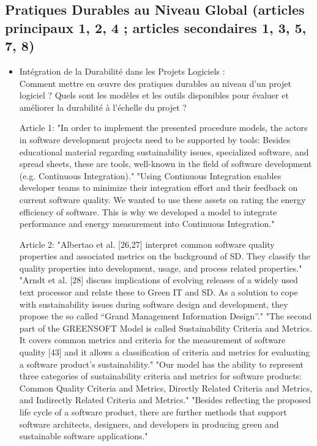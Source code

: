 \subsection{Pratiques Durables au Niveau Global (articles principaux 1, 2, 4 ; articles secondaires 1, 3, 5, 7, 8)}
    \begin{itemize}
    \item Intégration de la Durabilité dans les Projets Logiciels : \\
    Comment mettre en œuvre des pratiques durables au niveau d'un projet logiciel ? Quels sont les modèles et les outils disponibles pour évaluer et améliorer la durabilité à l'échelle du projet ?

Article 1:
"In order to implement the presented procedure models, the actors in software development projects need to be supported by tools: Besides educational material regarding sustainability issues, specialized software, and spread sheets, these are tools, well-known in the field of software development (e.g. Continuous Integration)." 
"Using Continuous Integration enables developer teams to minimize their integration effort and their feedback on current software quality. We wanted to use these assets on rating the energy efficiency of software. This is why we developed a model to integrate performance and energy measurement into Continuous Integration."

Article 2:
"Albertao et al. [26,27] interpret common software quality properties and associated metrics on the background of SD. They classify the quality properties into development, usage, and process related properties."
"Arndt et al. [28] discuss implications of evolving releases of a widely used text processor and relate these to Green IT and SD. As a solution to cope with sustainability issues during software design and development, they propose the so called “Grand Management Information Design”."
"The second part of the GREENSOFT Model is called Sustainability Criteria and Metrics. It covers common metrics and criteria for the measurement of software quality [43] and it allows a classification of criteria and metrics for evaluating a software product’s sustainability."
"Our model has the ability to represent three categories of sustainability criteria and metrics for software products: Common Quality Criteria and Metrics, Directly Related Criteria and Metrics, and Indirectly Related Criteria and Metrics."
"Besides reflecting the proposed life cycle of a software product, there are further methods that support software architects, designers, and developers in producing green and sustainable software applications."


\end{itemize}
